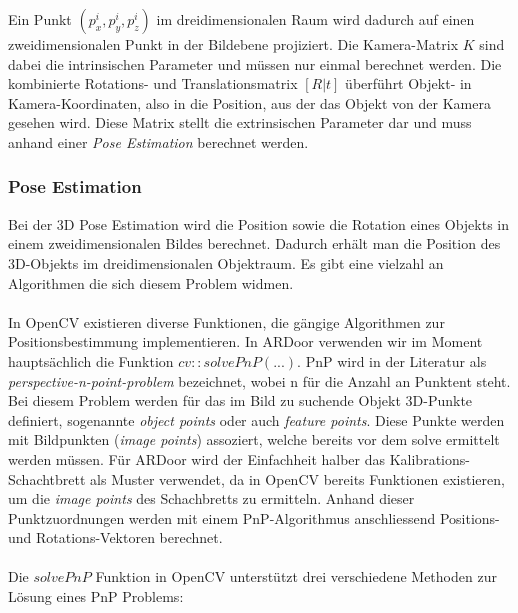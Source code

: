 \documentclass[main.tex]{subfiles}
\begin{document}
Ein Punkt $(p^i_x, p^i_y, p^i_z)$ im dreidimensionalen Raum wird dadurch auf einen zweidimensionalen Punkt in der Bildebene projiziert. Die Kamera-Matrix $K$ sind dabei die intrinsischen Parameter und müssen nur einmal berechnet werden. Die kombinierte Rotations- und Translationsmatrix $[R|t]$ überführt Objekt- in Kamera-Koordinaten, also in die Position, aus der das Objekt von der Kamera gesehen wird. Diese Matrix stellt die extrinsischen Parameter dar und muss anhand einer \textit{Pose Estimation} berechnet werden.

\subsubsection{Pose Estimation}
Bei der 3D Pose Estimation wird die Position sowie die Rotation eines Objekts in einem zweidimensionalen Bildes berechnet. Dadurch erhält man die Position des 3D-Objekts im dreidimensionalen Objektraum. Es gibt eine vielzahl an Algorithmen die sich diesem Problem widmen.

\paragraph{}
In OpenCV existieren diverse Funktionen, die gängige Algorithmen zur Positionsbestimmung implementieren. In ARDoor verwenden wir im Moment hauptsächlich die Funktion $cv::solvePnP(...)$. PnP wird in der Literatur als \textit{perspective-n-point-problem} bezeichnet, wobei n für die Anzahl an Punktent steht. Bei diesem Problem werden für das im Bild zu suchende Objekt 3D-Punkte definiert, sogenannte \textit{object points} oder auch \textit{feature points}. Diese Punkte werden mit Bildpunkten (\textit{image points}) assoziert, welche bereits vor dem solve ermittelt werden müssen. Für ARDoor wird der Einfachheit halber das Kalibrations-Schachtbrett als Muster verwendet, da in OpenCV bereits Funktionen existieren, um die \textit{image points} des Schachbretts zu ermitteln. Anhand dieser Punktzuordnungen werden mit einem PnP-Algorithmus anschliessend Positions- und Rotations-Vektoren berechnet.

\paragraph{}
Die $solvePnP$ Funktion in OpenCV unterstützt drei verschiedene Methoden zur Lösung eines PnP Problems:
\end{document}
